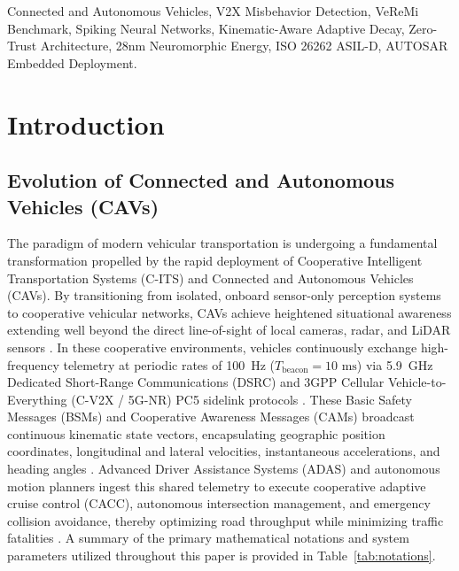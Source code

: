 \documentclass[journal]{IEEEtran}
\begin{document}
\begin{IEEEkeywords}
Connected and Autonomous Vehicles, V2X Misbehavior Detection, VeReMi Benchmark, Spiking Neural Networks, Kinematic-Aware Adaptive Decay, Zero-Trust Architecture, 28nm Neuromorphic Energy, ISO 26262 ASIL-D, AUTOSAR Embedded Deployment.
\end{IEEEkeywords}

\section{Introduction}

\subsection{Evolution of Connected and Autonomous Vehicles (CAVs)}
The paradigm of modern vehicular transportation is undergoing a fundamental transformation propelled by the rapid deployment of Cooperative Intelligent Transportation Systems (C-ITS) and Connected and Autonomous Vehicles (CAVs). By transitioning from isolated, onboard sensor-only perception systems to cooperative vehicular networks, CAVs achieve heightened situational awareness extending well beyond the direct line-of-sight of local cameras, radar, and LiDAR sensors \cite{abdelhakeem2025survey, hasan2020securing}. In these cooperative environments, vehicles continuously exchange high-frequency telemetry at periodic rates of 100~Hz ($T_{\text{beacon}} = 10\text{ ms}$) via 5.9~GHz Dedicated Short-Range Communications (DSRC) and 3GPP Cellular Vehicle-to-Everything (C-V2X / 5G-NR) PC5 sidelink protocols \cite{kamel2020simulation, chen2017v2x}. These Basic Safety Messages (BSMs) and Cooperative Awareness Messages (CAMs) broadcast continuous kinematic state vectors, encapsulating geographic position coordinates, longitudinal and lateral velocities, instantaneous accelerations, and heading angles \cite{van2018veremi}. Advanced Driver Assistance Systems (ADAS) and autonomous motion planners ingest this shared telemetry to execute cooperative adaptive cruise control (CACC), autonomous intersection management, and emergency collision avoidance, thereby optimizing road throughput while minimizing traffic fatalities \cite{kuutti2021survey}. A summary of the primary mathematical notations and system parameters utilized throughout this paper is provided in Table~\ref{tab:notations}.
\end{document}
